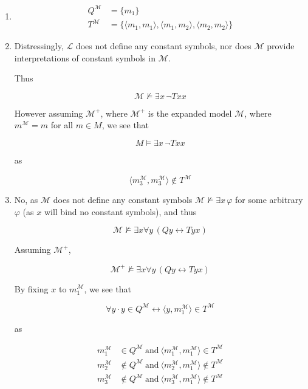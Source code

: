 \documentclass[a4paper]{article}
\newcommand{\MODEL}{\mathcal{M}}
\newcommand{\LANGUAGE}{\mathcal{L}}
\newcommand{\TUPLE}[1]{\langle {#1} \rangle}
\begin{document}
\begin{enumerate}
    \item \begin{align*}
        Q^{\MODEL} &= \{ m_1 \}\\
        T^{\MODEL} &= \{ \TUPLE{m_1, m_1}, \TUPLE{m_1, m_2}, \TUPLE{m_2, m_2} \}
    \end{align*}

    \item Distressingly, $\LANGUAGE$ does not define any constant symbols, nor does $\MODEL$ provide interpretations of constant symbols in  $\MODEL$.

    Thus

    \[\mathcal{M} \nvDash \exists x\, \neg Txx\]

    However assuming $\MODEL^+$, where $\MODEL^+$ is the expanded model $\mathcal{M}$, where $m^{\MODEL} = m$ for all $m \in M$, we see that

    \[M \models \exists x\, \neg Txx\]

    as

    \[\TUPLE{m_{3}^{\MODEL}, m_{3}^{\MODEL}} \not\in T^{\MODEL}\]

    \item No, as $\MODEL$  does not define any constant symbols $\MODEL \nvDash \exists x\, \varphi$ for some arbitrary $\varphi$ (as $x$ will bind no constant symbols), and thus

    \[\MODEL \nvDash \exists x \forall y\, (Qy \leftrightarrow Tyx)\]

    Assuming $\MODEL^+$,


    \[\MODEL^+ \nvDash \exists x \forall y\, (Qy \leftrightarrow Tyx)\]
    
    By fixing $x$ to $m_{1}^{\MODEL}$, we see that

    \[\forall y \cdot y \in Q^{\MODEL} \leftrightarrow \TUPLE{y, m_{1}^\MODEL} \in T^{\MODEL}\]

    as 
    
    \begin{align*}
    m_{1}^\MODEL & \in Q^{\MODEL}\  \text{and}\ \TUPLE{m_{1}^\MODEL, m_{1}^\MODEL} \in T^{\MODEL}\\
    m_{2}^\MODEL & \not\in Q^{\MODEL}\  \text{and}\ \TUPLE{m_{2}^\MODEL, m_{1}^\MODEL} \not\in T^{\MODEL}\\
    m_{3}^\MODEL & \not\in Q^{\MODEL}\  \text{and}\ \TUPLE{m_{3}^\MODEL, m_{1}^\MODEL} \not\in T^{\MODEL}
    \end{align*}

\end{enumerate}
\end{document}
